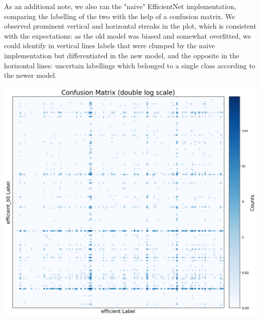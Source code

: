 \documentclass[10pt]{article}
\begin{document}
\begin{minipage}{0.55\linewidth}
As an additional note, we also ran the "naive" EfficientNet implementation, comparing the labelling of the two with the help of a confusion matrix. We observed prominent vertical and horizontal streaks in the plot, which is consistent with the expectations: as the old model was biased and somewhat overfitted, we could identify in vertical lines labels that were clumped by the naive implementation but differentiated in the new model, and the opposite in the horizontal lines: uncertain labellings which belonged to a single class according to the newer model.
\end{minipage}
\hfill
\begin{minipage}{0.35\linewidth}
  \includegraphics[width=\linewidth]{img/confusion_matrix_efficient_models.png}
\end{minipage}

\vspace{1em}
\end{document}

